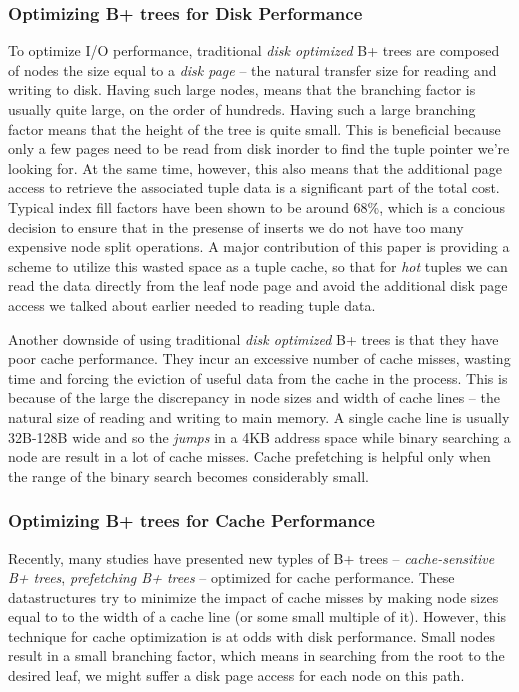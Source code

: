 \documentclass{article}
\begin{document}
\subsubsection{Optimizing B+ trees for Disk Performance}

To optimize I/O performance, traditional \textit{disk optimized} B+ trees are composed of nodes the size equal to a \textit{disk page} -- the natural transfer size for reading and writing to disk. Having such large nodes, means that the branching factor is usually quite large, on the order of hundreds. Having such a large branching factor means that the height of the tree is quite small. This is beneficial because only a few pages need to be read from disk inorder to find the tuple pointer we're looking for. At the same time, however, this also means that the additional page access to retrieve the associated tuple data is a significant part of the total cost. Typical index fill factors have been shown to be around 68\%, which is a concious decision to ensure that in the presense of inserts we do not have too many expensive node split operations. A major contribution of this paper is providing a scheme to utilize this wasted space as a tuple cache, so that for \textit{hot} tuples we can read the data directly from the leaf node page and avoid the additional disk page access we talked about earlier needed to reading tuple data.

Another downside of using traditional \textit{disk optimized} B+ trees is that they have poor cache performance. They incur an excessive number of cache misses, wasting time and forcing the eviction of useful data from the cache in the process. This is because of the large the discrepancy in node sizes and width of cache lines -- the natural size of reading and writing to main memory. A single cache line is usually 32B-128B wide and so the \textit{jumps} in a 4KB address space while binary searching a node are result in a lot of cache misses. Cache prefetching is helpful only when the range of the binary search becomes considerably small.

\subsubsection{Optimizing B+ trees for Cache Performance}

Recently, many studies have presented new typles of B+ trees -- \textit{cache-sensitive B+ trees}, \textit{prefetching B+ trees} -- optimized for cache performance. These datastructures try to minimize the impact of cache misses by making node sizes equal to to the width of a cache line (or some small multiple of it). However, this technique for cache optimization is at odds with disk performance. Small nodes result in a small branching factor, which means in searching from the root to the desired leaf, we might suffer a disk page access for each node on this path.
\end{document}
